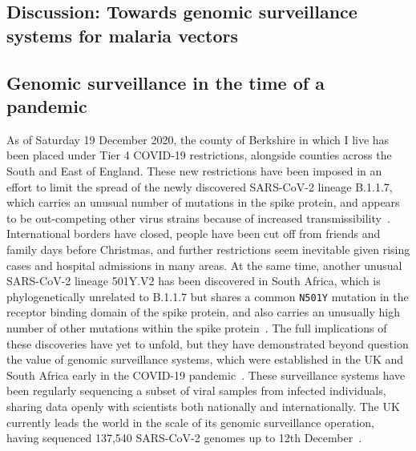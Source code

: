 \begin{refsection}
\chapter[Discussion]{
Discussion: Towards genomic surveillance systems for malaria vectors
}\label{ch:discussion}


\section{Genomic surveillance in the time of a pandemic}\label{sec:discuss-pandemic}


As of Saturday 19 December 2020, the county of Berkshire in which I live has been placed under Tier 4 COVID-19 restrictions, alongside counties across the South and East of England.
%
These new restrictions have been imposed in an effort to limit the spread of the newly discovered SARS-CoV-2 lineage B.1.1.7, which carries an unusual number of mutations in the spike protein, and appears to be out-competing other virus strains because of increased transmissibility~\parencite{Rambaut2020,Davies2020}.
%
International borders have closed, people have been cut off from friends and family days before Christmas, and further restrictions seem inevitable given rising cases and hospital admissions in many areas.
%
At the same time, another unusual SARS-CoV-2 lineage 501Y.V2 has been discovered in South Africa, which is phylogenetically unrelated to B.1.1.7 but shares a common \texttt{N501Y} mutation in the receptor binding domain of the spike protein, and also carries an unusually high number of other mutations within the spike protein~\parencite{Tegally2020}.
%
The full implications of these discoveries have yet to unfold, but they have demonstrated beyond question the value of genomic surveillance systems, which were established in the UK and South Africa early in the COVID-19 pandemic~\parencite{COGUK2020a,Msomi2020}.
%
These surveillance systems have been regularly sequencing a subset of viral samples from infected individuals, sharing data openly with scientists both nationally and internationally.
%
The UK currently leads the world in the scale of its genomic surveillance operation, having sequenced 137,540 SARS-CoV-2 genomes up to 12th December~\parencite{COGUK2020b}.



\end{refsection}
